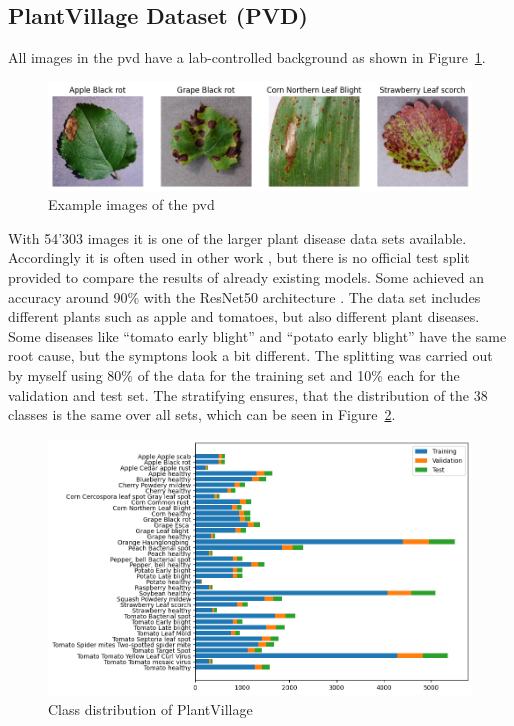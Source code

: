 \subsection{PlantVillage Dataset (PVD)}
All images in the \gls{pvd} have a lab-controlled background as shown in Figure~\ref{fig:example_images_of_plantvillage}. 
\begin{figure}[H]
    \begin{center}
    \includegraphics[width=15cm]{../images/example_images_of_plantvillage.png}
    \caption{Example images of the \gls{pvd}}\label{fig:example_images_of_plantvillage}
    \end{center}
\end{figure}
With 54'303 images it is one of the larger plant disease data sets available. Accordingly it is often used in other work \autocite{hughes2016}, but there is no official test split provided to compare the results of already existing models. Some achieved an accuracy around 90\% with the ResNet50 architecture \autocite{gole2023}.
The data set includes different plants such as apple and tomatoes, but also different plant diseases. Some diseases like ``tomato early blight'' and ``potato early blight'' have the same root cause, but the symptons look a bit different. 
The splitting was carried out by myself using 80\% of the data for the training set and 10\% each for the validation and test set. The stratifying ensures, that the distribution of the 38 classes is the same over all sets, which can be seen in Figure~\ref{fig:class_distribution_of_plantvillage}.
\begin{figure}[H]
    \begin{center}
    \includegraphics[width=15cm]{../images/class_distribution_of_plantvillage.png}
    \caption{Class distribution of PlantVillage}\label{fig:class_distribution_of_plantvillage}
    \end{center}
\end{figure}

